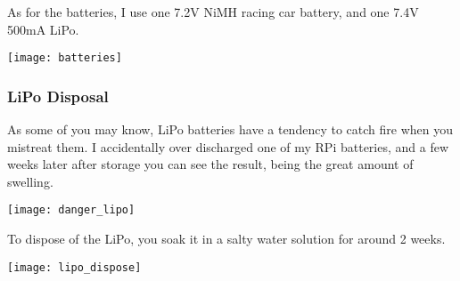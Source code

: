                 As for the batteries, I use one 7.2V NiMH racing car battery, and one 7.4V 500mA LiPo.\\
                
             	\centerline{\texttt{[image: batteries]}}
                \vspace{10pt}
                
                \subsubsection{LiPo Disposal}
                	As some of you may know, LiPo batteries have a tendency to catch fire when you mistreat them. I accidentally over discharged one of my RPi batteries, and a few weeks later after storage you can see the result, being the great amount of swelling.\\
                    
                    \centerline{\texttt{[image: danger\_lipo]}}
                    \vspace{10pt}
                    
                    To dispose of the LiPo, you soak it in a salty water solution for around 2 weeks.\\
                    
                    \centerline{\texttt{[image: lipo\_dispose]}}
                    \vspace{10pt}

